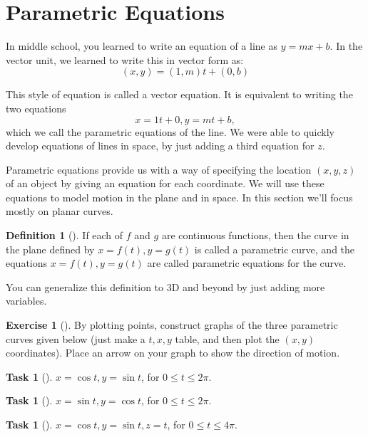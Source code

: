 \documentclass[10pt,]{book}
\theoremstyle{plain}
\theoremstyle{definition}
\newtheorem{definition}[theorem]{Definition}
\theoremstyle{definition}
\theoremstyle{definition}
\theoremstyle{definition}
\newtheorem{exploration}[project]{Exercise}
\newtheorem{task}[project]{Task}
\theoremstyle{definition}
\numberwithin{equation}{section}
\begin{document}
\section[{Parametric Equations}]{Parametric Equations}\label{section-12}
In middle school, you learned to write an equation of a line as \(y=mx+b\). In the vector unit, we learned to write this in vector form as:%
\begin{equation*}
(x,y)=(1,m)t+(0,b)
\end{equation*}
%
\par
This style of equation is called a vector equation. It is equivalent to writing the two equations%
\begin{equation*}
x=1t+0,y=mt+b,
\end{equation*}
which we call the parametric equations of the line. We were able to quickly develop equations of lines in space, by just adding a third equation for \(z\).%
\par
Parametric equations provide us with a way of specifying the location \((x,y,z)\) of an object by giving an equation for each coordinate. We will use these equations to model motion in the plane and in space. In this section we'll focus mostly on planar curves.%
\begin{definition}[{}]\label{definition-18}
If each of \(f\) and \(g\) are continuous functions, then the curve in the plane defined by \(x=f(t),y=g(t)\) is called a parametric curve, and the equations \(x=f(t),y=g(t)\) are called parametric equations for the curve.%
\end{definition}
You can generalize this definition to 3D and beyond by just adding more variables.%
\begin{exploration}[]\label{exploration-72}
By plotting points, construct graphs of the three parametric curves given below (just make a \(t,x,y\) table, and then plot the \((x,y)\) coordinates). Place an arrow on your graph to show the direction of motion.%
\par
%
\begin{task}[]\label{task-116}
\(x=\cos t, y=\sin t\), for \(0\leq t\leq 2\pi\).%
\end{task}
\begin{task}[]\label{task-117}
\(x=\sin t, y=\cos t\), for \(0\leq t\leq 2\pi\).%
\end{task}
\begin{task}[]\label{task-118}
\(x=\cos t, y=\sin t, z=t\), for \(0\leq t\leq 4\pi\).%
\end{task}
\end{exploration}
\end{document}
